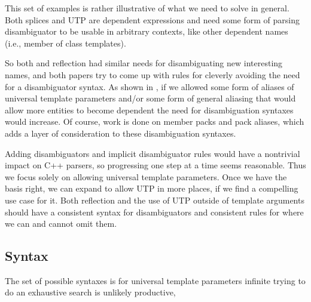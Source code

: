 \documentclass{wg21}
\begin{document}
This set of examples is rather illustrative of what we need to solve in general.
Both splices and UTP are dependent expressions and need some form of parsing disambiguator to be usable
in arbitrary contexts, like other dependent names (i.e., member of class templates).

So both  and reflection had similar needs for disambiguating new interesting names, and
both papers try to come up with rules for cleverly avoiding the need for a disambiguator syntax.
As shown in , if we allowed some form of aliases of universal template parameters and/or some form of general aliasing that would allow more entities to become dependent
the need for disambiguation syntaxes would increase.
Of course, work is done on member packs and pack aliases, which adds a layer of consideration to these disambiguation syntaxes.

Adding disambiguators and implicit disambiguator rules would have a nontrivial impact on C++ parsers, so progressing one step at a time seems reasonable.
Thus we focus solely on allowing universal template parameters. Once we have the basis right, we can expand to
allow UTP in more places, if we find a compelling use case for it. Both reflection and the use of UTP outside of template arguments should have a consistent syntax for disambiguators and consistent rules for where we can and cannot omit them.

\subsection{Syntax}

The set of possible syntaxes is for universal template parameters infinite trying to do an exhaustive search is unlikely productive,
\end{document}
